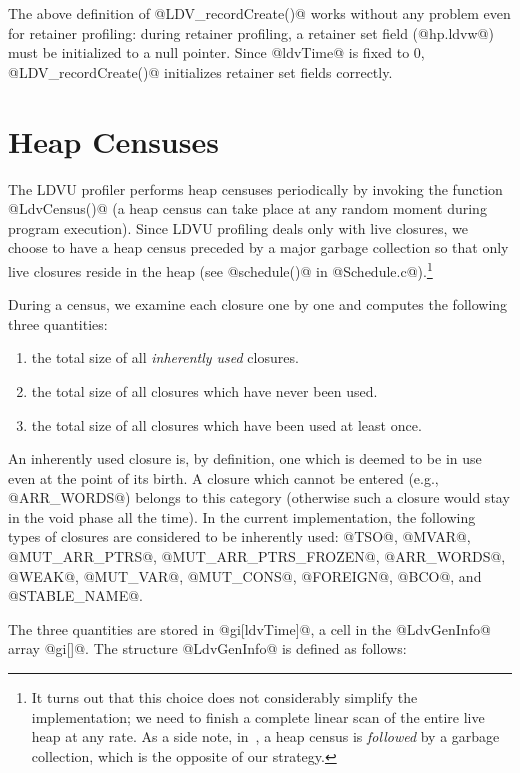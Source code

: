 \documentclass{article}
\begin{document}
The above definition of @LDV_recordCreate()@ works without any problem
even for retainer profiling: during retainer profiling, 
a retainer set field (@hp.ldvw@) must be initialized to a null pointer.
Since @ldvTime@ is fixed to $0$, @LDV_recordCreate()@ initializes 
retainer set fields correctly.

\section{Heap Censuses}

The LDVU profiler performs heap censuses periodically by invoking the
function @LdvCensus()@
(a heap census can 
take place at any random moment during program execution).
Since LDVU profiling deals only with live closures, we choose to have
a heap census preceded by a major garbage collection so that only live
closures reside in the heap 
(see @schedule()@ in @Schedule.c@).\footnote{It turns out that this
choice does not considerably simplify the implementation; we need to
finish a complete linear scan of the entire live heap at any rate. 
As a side note, in~\cite{RR}, a heap census is \emph{followed} by a garbage
collection, which is the opposite of our strategy.}

During a census, we examine each closure one by one and computes the following
three quantities:

\begin{enumerate}
\item the total size of all \emph{inherently used} closures.
\item the total size of all closures which have never been used.
\item the total size of all closures which have been used at least once. 
\end{enumerate}

An inherently used closure is, by definition, one which is deemed to
be in use even at the point of its birth. A closure which cannot be
entered (e.g., @ARR_WORDS@) belongs to this category (otherwise
such a closure would stay in the void phase all the time).
In the current implementation, the following types of closures are 
considered to be inherently used:
@TSO@, @MVAR@, @MUT_ARR_PTRS@, @MUT_ARR_PTRS_FROZEN@, @ARR_WORDS@,
@WEAK@, @MUT_VAR@, @MUT_CONS@, @FOREIGN@, @BCO@, and @STABLE_NAME@.

The three quantities are stored in @gi[ldvTime]@, a cell in the @LdvGenInfo@ array 
@gi[]@.
The structure @LdvGenInfo@ is defined as follows:
\end{document}
